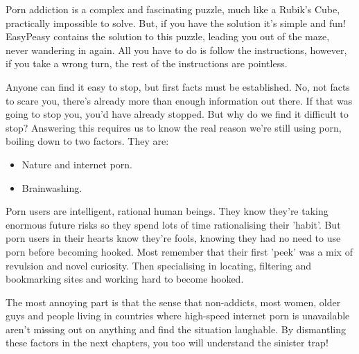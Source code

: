 \documentclass[easypeasy.tex]{subfiles}
\begin{document}
Porn addiction is a complex and fascinating puzzle, much like a Rubik's Cube, practically impossible to solve. But, if you have the solution it's simple and fun! EasyPeasy contains the solution to this puzzle, leading you out of the maze, never wandering in again. All you have to do is follow the instructions, however, if you take a wrong turn, the rest of the instructions are pointless.

Anyone can find it easy to stop, but first facts must be established. No, not facts to scare you, there's already more than enough information out there. If that was going to stop you, you'd have already stopped. But why do we find it difficult to stop? Answering this requires us to know the real reason we're still using porn, boiling down to two factors. They are:
\begin{itemize}
  \item Nature and internet porn.
  \item Brainwashing.
\end{itemize}

Porn users are intelligent, rational human beings. They know they're taking enormous future risks so they spend lots of time rationalising their 'habit'. But porn users in their hearts know they're fools, knowing they had no need to use porn before becoming hooked. Most remember that their first 'peek' was a mix of revulsion and novel curiosity. Then specialising in locating, filtering and bookmarking sites and working hard to become hooked.

The most annoying part is that the sense that non-addicts, most women, older guys and people living in countries where high-speed internet porn is unavailable aren't missing out on anything and find the situation laughable. By dismantling these factors in the next chapters, you too will understand the sinister trap!
\end{document}
